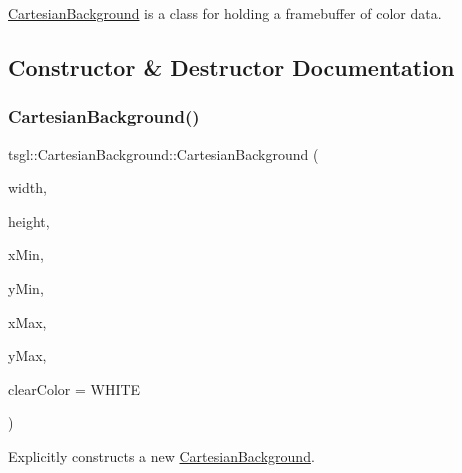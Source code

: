 \hyperlink{classtsgl_1_1_cartesian_background}{Cartesian\+Background} is a class for holding a framebuffer of color data. 

\subsection{Constructor \& Destructor Documentation}
\mbox{\label{classtsgl_1_1_cartesian_background_aff44104863ff24b333e599e03a837318}} 
\subsubsection{\texorpdfstring{Cartesian\+Background()}{CartesianBackground()}}
{\footnotesize\ttfamily tsgl\+::\+Cartesian\+Background\+::\+Cartesian\+Background (\begin{DoxyParamCaption}\item[{G\+Lint}]{width,  }\item[{G\+Lint}]{height,  }\item[{Decimal}]{x\+Min,  }\item[{Decimal}]{y\+Min,  }\item[{Decimal}]{x\+Max,  }\item[{Decimal}]{y\+Max,  }\item[{const \hyperlink{structtsgl_1_1_color_float}{Color\+Float} \&}]{clear\+Color = {\ttfamily WHITE} }\end{DoxyParamCaption})}



Explicitly constructs a new \hyperlink{classtsgl_1_1_cartesian_background}{Cartesian\+Background}. 

